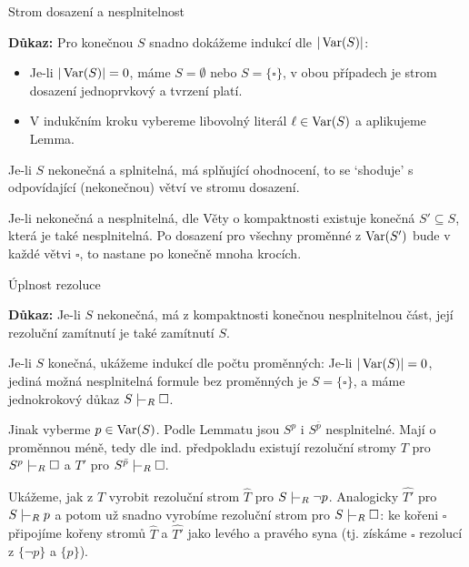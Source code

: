 \documentclass{beamer}
\begin{document}
\begin{frame}{Strom dosazení a nesplnitelnost}
    
    \pause

    \textbf{Důkaz:} 
        Pro \alert{konečnou} $S$ snadno dokážeme indukcí dle $|\operatorname{Var}(S)|$: \pause
        \begin{itemize}
            \item Je-li $|\operatorname{Var}(S)|=0$, máme $S=\emptyset$ nebo $S=\{\square\}$, v obou případech je strom dosazení jednoprvkový a tvrzení platí. \pause
            \item V indukčním kroku vybereme libovolný literál $\ell\in\operatorname{Var}(S)$ a aplikujeme Lemma.\pause
        \end{itemize} 
    Je-li $S$ \alert{nekonečná a splnitelná}, má splňující ohodnocení, to se `shoduje' s odpovídající (nekonečnou) větví ve stromu dosazení. \pause
    
    Je-li \alert{nekonečná a nesplnitelná}, dle Věty o kompaktnosti existuje konečná $S'\subseteq S$, která je také nesplnitelná. Po dosazení pro všechny proměnné z $\operatorname{Var}(S')$ bude v každé větvi $\square$, to nastane po konečně mnoha krocích.
    \hfill\qedsymbol

\end{frame}


\begin{frame}{Úplnost rezoluce}

    \pause

    \textbf{Důkaz:} \alert{Je-li $S$ nekonečná}, má z kompaktnosti konečnou nesplnitelnou část, její rezoluční zamítnutí je také zamítnutí $S$. \pause
    
    \alert{Je-li $S$ konečná}, ukážeme indukcí dle počtu proměnných: \pause Je-li $|\operatorname{Var}(S)|=0$, jediná možná nesplnitelná formule bez proměnných je $S=\{\square\}$, a máme jednokrokový důkaz $S\proves_R\square$. \pause
    
    Jinak vyberme $p\in\operatorname{Var}(S)$. \pause Podle Lemmatu jsou $S^p$ i $S^{\bar p}$ nesplnitelné. \pause Mají o proměnnou méně, tedy dle ind. předpokladu existují rezoluční stromy $T$ pro $S^p\proves_R\square$ a $T'$ pro $S^{\bar p}\proves_R\square$.\pause

    Ukážeme, jak z $T$ vyrobit rezoluční strom $\widehat T$ pro $S\proves_R \neg p$. \pause Analogicky $\widehat{T'}$ pro $S\proves_R p$ a potom už snadno vyrobíme rezoluční strom pro $S\proves_R\square$: \pause ke kořeni $\square$ připojíme kořeny stromů $\widehat T$ a $\widehat{T'}$ jako levého a pravého syna (tj. získáme $\square$ rezolucí z $\{\neg p\}$ a $\{p\}$).

\end{frame}
\end{document}
